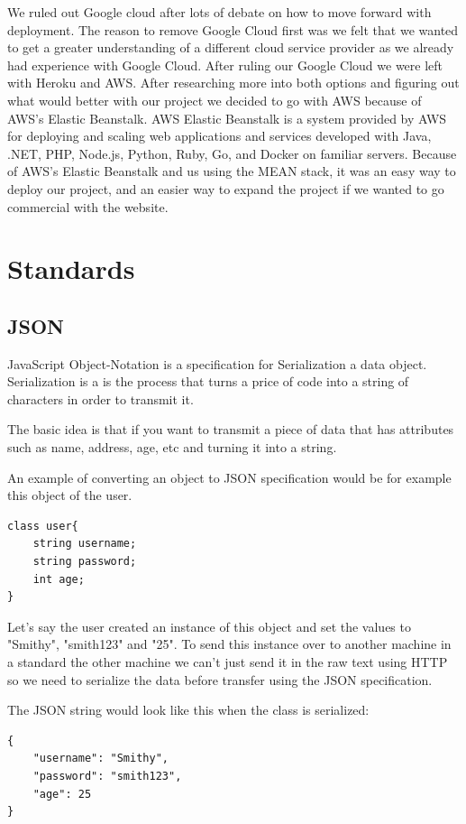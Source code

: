 We ruled out Google cloud after lots of debate on how to move forward with deployment. The reason to remove Google Cloud first was we felt that we wanted to get a greater understanding of a different cloud service provider as we already had experience with Google Cloud. After ruling our Google Cloud we were left with Heroku and AWS. After researching more into both options and figuring out what would better with our project we decided to go with AWS because of AWS's Elastic Beanstalk. AWS Elastic Beanstalk is a system provided by AWS for deploying and scaling web applications and services developed with Java, .NET, PHP, Node.js, Python, Ruby, Go, and Docker on familiar servers.  Because of AWS's Elastic Beanstalk and us using the MEAN stack, it was an easy way to deploy our project, and an easier way to expand the project if we wanted to go commercial with the website. \cite{S037872061730314220180901}

\section{Standards}
\subsection{JSON}
JavaScript Object-Notation is a specification for Serialization a data object. Serialization is a is the process that turns a price of code into a string of characters in order to transmit it. \cite{65486020130101}

The basic idea is that if you want to transmit a piece of data that has attributes such as name, address, age, etc and turning it into a string.

An example of converting an object to JSON specification would be for example this object of the user.

\begin{verbatim}
class user{
    string username;
    string password;
    int age;
}
\end{verbatim}

Let's say the user created an instance of this object and set the values to "Smithy", "smith123" and "25". To send this instance over to another machine in a standard the other machine we can't just send it in the raw text using HTTP so we need to serialize the data before transfer using the JSON specification. 

The JSON string would look like this when the class is serialized:
\begin{verbatim}
{
    "username": "Smithy",
    "password": "smith123",
    "age": 25
}
\end{verbatim}


